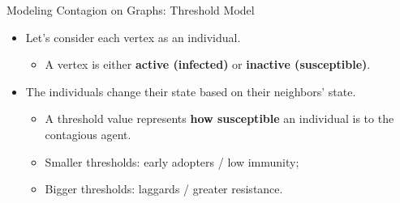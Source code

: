 \documentclass[10pt,aspectratio=169,english]{beamer}
\begin{document}
\begin{frame}{Modeling Contagion on Graphs: Threshold Model}

\begin{itemize}
    \item<1-> Let's consider each vertex as an individual.
    \begin{itemize}
        \item<1-> A vertex is either \textbf{active (infected)} or \textbf{inactive (susceptible)}.
    \end{itemize}
    \item<2-> The individuals change their state based on their neighbors' state.
    \begin{itemize}
        \item<2-> A threshold value represents \textbf{how susceptible} an individual is to the contagious agent.
        \item<2-> Smaller thresholds: early adopters / low immunity;
        \item<4-> Bigger thresholds: laggards / greater resistance.
    \end{itemize}
\end{itemize}



    
\end{frame}
\end{document}
